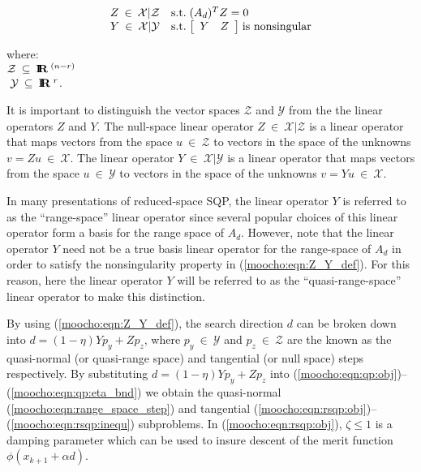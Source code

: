 \documentclass[pdf,ps2pdf,11pt]{SANDreport}
\begin{document}
{{{\bsinglespace
\begin{equation}
\begin{array}{ll}
Z \:\in\:\mathcal{X}|\mathcal{Z}
	& \mbox{s.t.} \; (A_d)^T Z = 0 \\
Y \:\in\:\mathcal{X}|\mathcal{Y}
	& \mbox{s.t.} \; {\bmat{cc} Y & Z \emat} \; \mbox{is nonsingular}
\end{array}
\label{moocho:eqn:Z_Y_def}
\end{equation}
\begin{tabbing}
\hspace{4ex}where:\hspace{5ex}\= \\
\>	$\mathcal{Z} \:\subseteq\:\mbox{\textbf{I}}\hspace{-0.6ex}\mbox{\textbf{R}}\:^{(n-r)}$ \\
\>	$\; \mathcal{Y} \:\subseteq\:\mbox{\textbf{I}}\hspace{-0.6ex}\mbox{\textbf{R}}\:^{r}$.
\end{tabbing}
\esinglespace}
%
It is important to distinguish the vector spaces $\mathcal{Z}$ and
$\mathcal{Y}$ from the the linear operators $Z$ and $Y$.  The null-space
linear operator $Z\:\in\:\mathcal{X}|\mathcal{Z}$ is a linear operator that
maps vectors from the space $u\:\in\:\mathcal{Z}$ to vectors in the space of
the unknowns $v = Z u \:\in\:\mathcal{X}$.  The linear operator
$Y\:\in\:\mathcal{X}|\mathcal{Y}$ is a linear operator that maps vectors from
the space $u\:\in\:\mathcal{Y}$ to vectors in the space of the unknowns $v = Y
u \:\in\:\mathcal{X}$.

In many presentations of reduced-space SQP, the linear operator $Y$ is
referred to as the ``range-space'' linear operator since several popular
choices of this linear operator form a basis for the range space of $A_d$.
However, note that the linear operator $Y$ need not be a true basis linear
operator for the range-space of $A_d$ in order to satisfy the nonsingularity
property in (\ref{moocho:eqn:Z_Y_def}).  For this reason, here the linear
operator $Y$ will be referred to as the ``quasi-range-space'' linear operator
to make this distinction.

By using (\ref{moocho:eqn:Z_Y_def}), the search direction $d$ can be broken
down into $d = (1-\eta) Y p_y + Z p_z$, where $p_y \:\in\:\mathcal{Y}$ and
$p_z \:\in\:\mathcal{Z}$ are the known as the quasi-normal (or quasi-range
space) and tangential (or null space) steps respectively.  By substituting $d
= (1-\eta) Y p_y + Z p_z$ into
(\ref{moocho:eqn:qp:obj})--(\ref{moocho:eqn:qp:eta_bnd}) we obtain the
quasi-normal (\ref{moocho:eqn:range_space_step}) and tangential
(\ref{moocho:eqn:rsqp:obj})--(\ref{moocho:eqn:rsqp:inequ}) subproblems.  In
(\ref{moocho:eqn:rsqp:obj}), $\zeta \leq 1 $ is a damping parameter which can
be used to insure descent of the merit function $\phi(x_{k+1}+\alpha
d)$.\\[1ex]

}}
\end{document}
